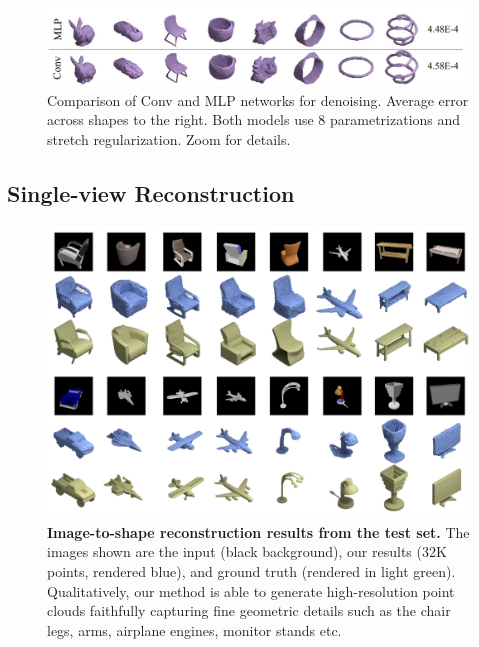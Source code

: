 \begin{figure}[ht!]
    \centering
    \vspace{-10pt}
    \includegraphics[width=1.0\linewidth]{imgs/conv_denoising.pdf}
    \vspace{-20pt}
    \caption{\label{fig:rebuttal}\small
    Comparison of Conv and MLP networks for denoising.
    Average error across shapes to the right. Both models use 8
    parametrizations and stretch regularization. Zoom for details.
    }
\end{figure}


\subsection{Single-view Reconstruction}

\begin{figure}[t]
\centering
\includegraphics[width=0.9\linewidth]{imgs/data.pdf}
\vspace{-8pt}
	\caption{\label{fig:data} \small
	\textbf{Image-to-shape reconstruction results from the test set.} The images shown are the input (black background), our results (32K points, rendered blue), and ground truth (rendered in light green). Qualitatively, our method is able to generate high-resolution point clouds faithfully capturing fine geometric details such as the chair legs, arms, airplane engines, monitor stands etc.}
	
\end{figure}

